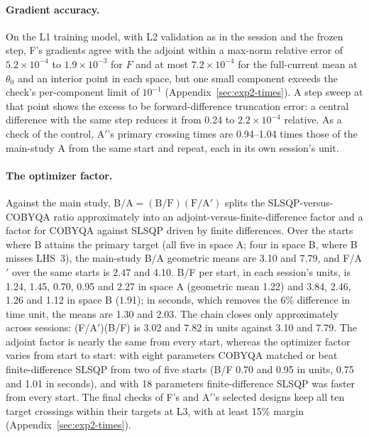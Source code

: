 \paragraph{Gradient accuracy.}
On the L1 training model, with L2 validation as in the session and the
frozen step, F's gradients agree with the adjoint within a max-norm relative
error of $5.2\times10^{-4}$ to $1.9\times10^{-3}$ for $F$ and at most
$7.2\times10^{-4}$ for the full-current mean at $\theta_0$ and an interior
point in each space, but one small component exceeds the check's
per-component limit of $10^{-1}$ (Appendix~\ref{sec:exp2-times}). A step
sweep at that point shows the excess to be forward-difference truncation
error: a central difference with the same step reduces it from 0.24 to
$2.2\times10^{-4}$ relative.
As a check of the control,
A$'$'s primary crossing times are 0.94--1.04 times those of the main-study A
from the same start and repeat, each in its own session's unit.

\paragraph{The optimizer factor.}
Against the main study, $\mathrm{B/A}=(\mathrm{B/F})(\mathrm{F/A'})$ splits
the SLSQP-versus-COBYQA ratio approximately into an adjoint-versus-finite-difference
factor and a factor for COBYQA against SLSQP driven by finite differences.
Over the starts where B attains the primary target (all five in space A;
four in space B, where B misses LHS~3), the main-study B/A geometric means
are 3.10 and 7.79, and F/A$'$ over the same starts is 2.47 and 4.10. B/F
per start, in each session's units, is 1.24, 1.45, 0.70, 0.95 and 2.27 in
space A (geometric mean 1.22) and 3.84, 2.46, 1.26 and 1.12 in space B
(1.91); in seconds, which removes the 6\% difference in time unit, the
means are 1.30 and 2.03. The chain closes only approximately across
sessions: (F/A$'$)(B/F) is 3.02 and 7.82 in units against 3.10 and 7.79.
The adjoint factor is nearly the same from every start, whereas the
optimizer factor varies from start to start: with eight parameters COBYQA
matched or beat finite-difference SLSQP from two of five starts (B/F 0.70
and 0.95 in units, 0.75 and 1.01 in seconds), and with 18 parameters
finite-difference SLSQP was faster from every start. The final checks of
F's and A$'$'s selected designs keep all ten target crossings within their
targets at L3, with at least 15\% margin (Appendix~\ref{sec:exp2-times}).
